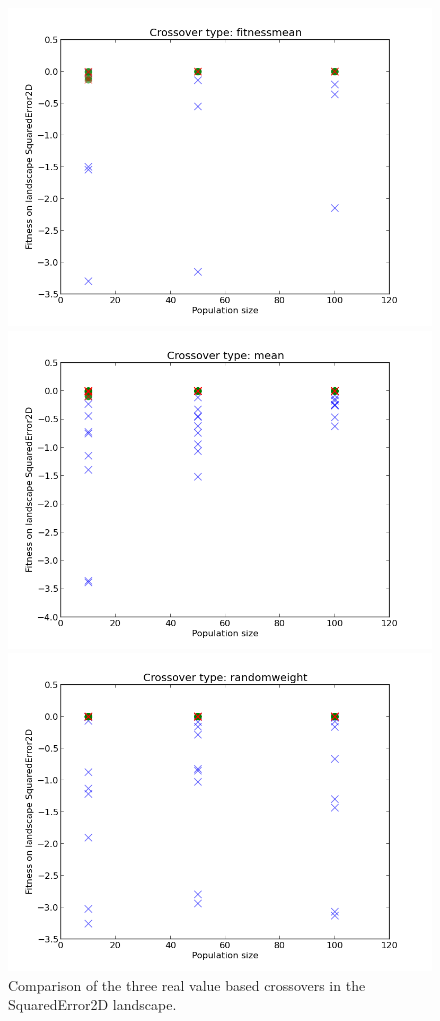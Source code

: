 \documentclass{scrartcl}
\begin{document}
\begin{figure}[H]
\centering
\begin{minipage}{.33\textwidth}
  \centering
  \includegraphics[width=.8\linewidth]{img/ex2/fitnessmean-SquaredError2D-pop.png}
\end{minipage}%
\begin{minipage}{.33\textwidth}
  \centering
  \includegraphics[width=.8\linewidth]{img/ex2/mean-SquaredError2D-pop.png}
\end{minipage}
\begin{minipage}{.33\textwidth}
  \centering
  \includegraphics[width=.8\linewidth]{img/ex2/randomweight-SquaredError2D-pop.png}
\end{minipage}
\caption{Comparison of the three real value based crossovers in the SquaredError2D landscape.}
\label{fig:realvaluecomp}
\end{figure}
\end{document}
